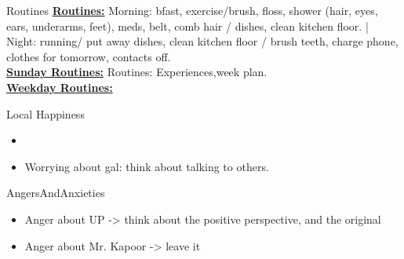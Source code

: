 \begin{columns}
\begin{column}{0.333\columnwidth}
  \begin{columns}
    \begin{column}{0.20\linewidth}
      \begin{block}{Routines}
        { \tiny \underline{\bf Routines:} Morning: bfast, exercise/brush,
          floss, shower (hair, eyes, ears, underarms, feet), meds, belt,
          comb hair / dishes, clean kitchen floor. |  Night: running/ put
          away dishes, clean kitchen floor / brush teeth, charge phone,
          clothes for tomorrow, contacts off.}\\
        {\tiny \underline{\bf Sunday Routines:} Routines:
          Experiences,week plan.}\\ 
        {\tiny \underline{\bf Weekday Routines:}}\\
      \end{block} 
      \begin{block}{Local Happiness}
        \begin{itemize} 
          \tiny \item \tiny
        \item \tiny Worrying about gal: think about talking to others.
        \end{itemize} 
      \end{block}
      \begin{block}{AngersAndAnxieties}
        \begin{itemize}
          \tiny \item \tiny Anger about UP -> think about the positive
          perspective, and the original
        \item \tiny Anger about Mr. Kapoor ->  leave it

\end{itemize}
\end{block}
\end{column}
\end{columns}
\end{column}
\end{columns}
